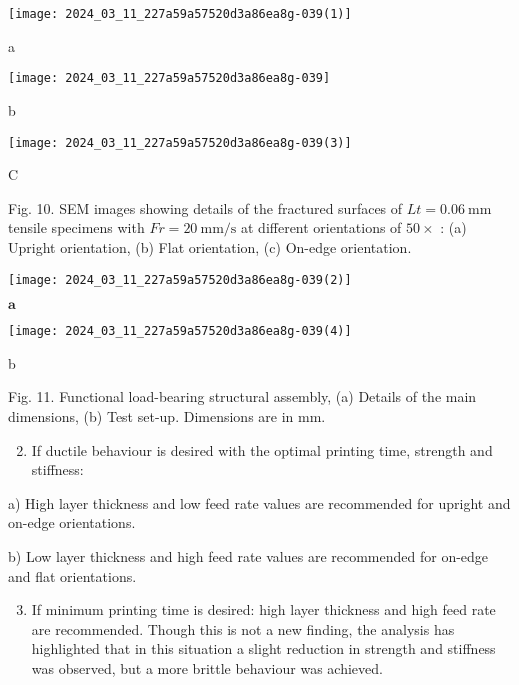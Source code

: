 \documentclass[10pt]{article}
\begin{document}
\begin{center}
\texttt{[image: 2024\_03\_11\_227a59a57520d3a86ea8g-039(1)]}
\end{center}

a

\begin{center}
\texttt{[image: 2024\_03\_11\_227a59a57520d3a86ea8g-039]}
\end{center}

b

\begin{center}
\texttt{[image: 2024\_03\_11\_227a59a57520d3a86ea8g-039(3)]}
\end{center}

C

Fig. 10. SEM images showing details of the fractured surfaces of $L t=0.06 \mathrm{~mm}$ tensile specimens with $F r=20 \mathrm{~mm} / \mathrm{s}$ at different orientations of $50 \times$ : (a) Upright orientation, (b) Flat orientation, (c) On-edge orientation.

\begin{center}
\texttt{[image: 2024\_03\_11\_227a59a57520d3a86ea8g-039(2)]}
\end{center}

$\mathbf{a}$

\begin{center}
\texttt{[image: 2024\_03\_11\_227a59a57520d3a86ea8g-039(4)]}
\end{center}

b

Fig. 11. Functional load-bearing structural assembly, (a) Details of the main dimensions, (b) Test set-up. Dimensions are in $\mathrm{mm}$.

\begin{enumerate}
  \setcounter{enumi}{1}
  \item If ductile behaviour is desired with the optimal printing time, strength and stiffness:
\end{enumerate}

a) High layer thickness and low feed rate values are recommended for upright and on-edge orientations.

b) Low layer thickness and high feed rate values are recommended for on-edge and flat orientations.

\begin{enumerate}
  \setcounter{enumi}{2}
  \item If minimum printing time is desired: high layer thickness and high feed rate are recommended. Though this is not a new finding, the analysis has highlighted that in this situation a slight reduction in strength and stiffness was observed, but a more brittle behaviour was achieved.
\end{enumerate}
\end{document}
